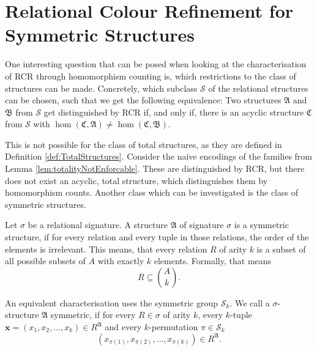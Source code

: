 \section {Relational Colour Refinement for Symmetric Structures}
\label{sec:RelationalColourRefinementForSymmetricStructures}

One interesting question that can be posed when looking at the characterisation of RCR through homomorphism counting is, which restrictions to the class of structures can be made.
Concretely, which subclass $\mathcal S$ of the relational structures can be chosen, such that we get the following equivalence:
Two structures $\mathfrak A$ and $\mathfrak B$ from $\mathcal S$ get distinguished by RCR if, and only if, there is an acyclic structure $\mathfrak C$ from $\mathcal S$ with $\hom(\mathfrak C, \mathfrak A)\neq \hom(\mathfrak C, \mathfrak B)$.

This is not possible for the class of total structures, as they are defined in Definition \ref{def:TotalStructures}.
Consider the naive encodings of the families from Lemma \ref{lem:totalityNotEnforcable}.
These are distinguished by RCR, but there does not exist an acyclic, total structure, which distinguishes them by homomorphism counts.
Another class which can be investigated is the class of symmetric structures.

\begin{definition}
	Let $\sigma$ be a relational signature.
	A structure $\mathfrak A$ of signature $\sigma$ is a symmetric structure, if for every relation and every tuple in those relations, the order of the elements is irrelevant.
	This means, that every relation $R$ of arity $k$ is a subset of all possible subsets of $A$ with exactly $k$ elements.
	Formally, that means
	$$R\subseteq \binom{A}{k}.$$
\end{definition}
An equivalent characterisation uses the symmetric group $\mathcal S_k$.
We call a $\sigma$-structure $\mathfrak A$ symmetric, if for every $R\in \sigma$ of arity $k$, every $k$-tuple $\mathbf x=(x_1,x_2,\dots,x_k)\in R^{\mathfrak A}$ and every $k$-permutation $\pi\in \mathcal S_k$
$$(x_{\pi(1)},x_{\pi(2)},\dots,x_{\pi(k)})\in R^{\mathfrak A}.$$

